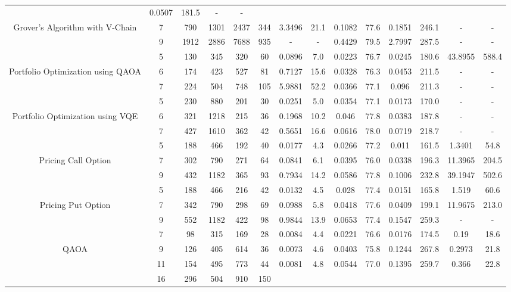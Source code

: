 \begin{table}[htb]
{\begin{tabular}{|c|c|c|c|c|c|c|c|c|c|c|c|c|c|}
 & 0.0507 & 181.5
 & - & -
 \\
Grover's Algorithm with V-Chain & 
7 & 790 & 1301 & 2437 & 344
 & 3.3496 & 21.1
 & 0.1082 & 77.6
 & 0.1851 & 246.1
 & - & -
 \\
 & 
9 & 1912 & 2886 & 7688 & 935
 & - & -
 & 0.4429 & 79.5
 & 2.7997 & 287.5
 & - & -
 \\
\hline
 & 
5 & 130 & 345 & 320 & 60
 & 0.0896 & 7.0
 & 0.0223 & 76.7
 & 0.0245 & 180.6
 & 43.8955 & 588.4
 \\
Portfolio Optimization using QAOA & 
6 & 174 & 423 & 527 & 81
 & 0.7127 & 15.6
 & 0.0328 & 76.3
 & 0.0453 & 211.5
 & - & -
 \\
 & 
7 & 224 & 504 & 748 & 105
 & 5.9881 & 52.2
 & 0.0366 & 77.1
 & 0.096 & 211.3
 & - & -
 \\
\hline
 & 
5 & 230 & 880 & 201 & 30
 & 0.0251 & 5.0
 & 0.0354 & 77.1
 & 0.0173 & 170.0
 & - & -
 \\
Portfolio Optimization using VQE & 
6 & 321 & 1218 & 215 & 36
 & 0.1968 & 10.2
 & 0.046 & 77.8
 & 0.0383 & 187.8
 & - & -
 \\
 & 
7 & 427 & 1610 & 362 & 42
 & 0.5651 & 16.6
 & 0.0616 & 78.0
 & 0.0719 & 218.7
 & - & -
 \\
\hline
 & 
5 & 188 & 466 & 192 & 40
 & 0.0177 & 4.3
 & 0.0266 & 77.2
 & 0.011 & 161.5
 & 1.3401 & 54.8
 \\
Pricing Call Option & 
7 & 302 & 790 & 271 & 64
 & 0.0841 & 6.1
 & 0.0395 & 76.0
 & 0.0338 & 196.3
 & 11.3965 & 204.5
 \\
 & 
9 & 432 & 1182 & 365 & 93
 & 0.7934 & 14.2
 & 0.0586 & 77.8
 & 0.1006 & 232.8
 & 39.1947 & 502.6
 \\
\hline
 & 
5 & 188 & 466 & 216 & 42
 & 0.0132 & 4.5
 & 0.028 & 77.4
 & 0.0151 & 165.8
 & 1.519 & 60.6
 \\
Pricing Put Option & 
7 & 342 & 790 & 298 & 69
 & 0.0988 & 5.8
 & 0.0418 & 77.6
 & 0.0409 & 199.1
 & 11.9675 & 213.0
 \\
 & 
9 & 552 & 1182 & 422 & 98
 & 0.9844 & 13.9
 & 0.0653 & 77.4
 & 0.1547 & 259.3
 & - & -
 \\
\hline
 & 
7 & 98 & 315 & 169 & 28
 & 0.0084 & 4.4
 & 0.0221 & 76.6
 & 0.0176 & 174.5
 & 0.19 & 18.6
 \\
QAOA & 
9 & 126 & 405 & 614 & 36
 & 0.0073 & 4.6
 & 0.0403 & 75.8
 & 0.1244 & 267.8
 & 0.2973 & 21.8
 \\
 & 
11 & 154 & 495 & 773 & 44
 & 0.0081 & 4.8
 & 0.0544 & 77.0
 & 0.1395 & 259.7
 & 0.366 & 22.8
 \\
\hline
 & 
16 & 296 & 504 & 910 & 150

\end{tabular}}
\end{table}
